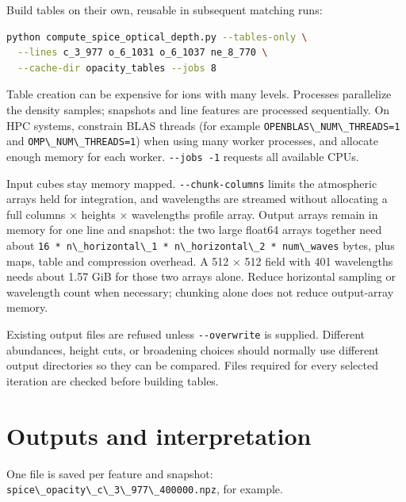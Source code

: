 \documentclass[
]{article}
\newcommand{\passthrough}[1]{#1}
\begin{document}
Build tables on their own, reusable in subsequent matching runs:

\begin{lstlisting}[language=bash]
python compute_spice_optical_depth.py --tables-only \
  --lines c_3_977 o_6_1031 o_6_1037 ne_8_770 \
  --cache-dir opacity_tables --jobs 8
\end{lstlisting}

Table creation can be expensive for ions with many levels. Processes
parallelize the density samples; snapshots and line features are
processed sequentially. On HPC systems, constrain BLAS threads (for
example \passthrough{\lstinline!OPENBLAS\_NUM\_THREADS=1!} and
\passthrough{\lstinline!OMP\_NUM\_THREADS=1!}) when using many worker
processes, and allocate enough memory for each worker.
\passthrough{\lstinline!--jobs -1!} requests all available CPUs.

Input cubes stay memory mapped.
\passthrough{\lstinline!--chunk-columns!} limits the atmospheric arrays
held for integration, and wavelengths are streamed without allocating a
full columns × heights × wavelengths profile array. Output arrays remain
in memory for one line and snapshot: the two large float64 arrays
together need about
\passthrough{\lstinline!16 * n\_horizontal\_1 * n\_horizontal\_2 * num\_waves!}
bytes, plus maps, table and compression overhead. A 512 × 512 field with
401 wavelengths needs about 1.57 GiB for those two arrays alone. Reduce
horizontal sampling or wavelength count when necessary; chunking alone
does not reduce output-array memory.

Existing output files are refused unless
\passthrough{\lstinline!--overwrite!} is supplied. Different abundances,
height cuts, or broadening choices should normally use different output
directories so they can be compared. Files required for every selected
iteration are checked before building tables.

\section{Outputs and interpretation}\label{outputs-and-interpretation}

One file is saved per feature and snapshot:
\passthrough{\lstinline!spice\_opacity\_c\_3\_977\_400000.npz!}, for
example.
\end{document}
